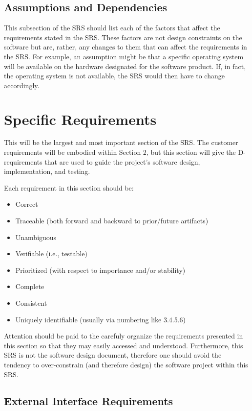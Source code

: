 \documentclass[titlepage]{article}
\begin{document}
\subsection{Assumptions and Dependencies}
This subsection of the SRS should list each of the factors that affect the requirements stated in the SRS. These factors are not design constraints on the software but are, rather, any changes to them that can affect the requirements in the SRS. For example, an assumption might be that a specific operating system will be available on the hardware designated for the software product. If, in fact, the operating system is not available, the SRS would then have to change accordingly.

\section{Specific Requirements}
This will be the largest and most important section of the SRS.  The customer requirements will be embodied within Section 2, but this section will give the D-requirements that are used to guide the project’s software design, implementation, and testing.

Each requirement in this section should be:
\begin{itemize}
	\item Correct
	\item Traceable (both forward and backward to prior/future artifacts)
	\item Unambiguous
	\item Verifiable (i.e., testable)
	\item Prioritized (with respect to importance and/or stability)
	\item Complete
	\item Consistent
	\item Uniquely identifiable (usually via numbering like 3.4.5.6)
\end{itemize}

Attention should be paid to the carefuly organize the requirements presented in this section so that they may easily accessed and understood.  Furthermore, this SRS is not the software design document, therefore one should avoid the tendency to over-constrain (and therefore design) the software project within this SRS.

\subsection{External Interface Requirements}
\end{document}
